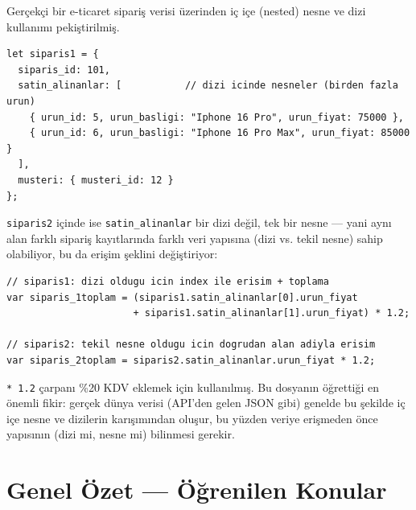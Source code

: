 \documentclass[11pt,a4paper]{article}
\begin{document}
Gerçekçi bir e-ticaret sipariş verisi üzerinden iç içe (nested) nesne ve dizi kullanımı pekiştirilmiş.

\begin{lstlisting}
let siparis1 = {
  siparis_id: 101,
  satin_alinanlar: [           // dizi icinde nesneler (birden fazla urun)
    { urun_id: 5, urun_basligi: "Iphone 16 Pro", urun_fiyat: 75000 },
    { urun_id: 6, urun_basligi: "Iphone 16 Pro Max", urun_fiyat: 85000 }
  ],
  musteri: { musteri_id: 12 }
};
\end{lstlisting}

\texttt{siparis2} içinde ise \texttt{satin\_alinanlar} bir dizi değil, tek bir nesne --- yani aynı alan farklı sipariş kayıtlarında farklı veri yapısına (dizi vs. tekil nesne) sahip olabiliyor, bu da erişim şeklini değiştiriyor:

\begin{lstlisting}
// siparis1: dizi oldugu icin index ile erisim + toplama
var siparis_1toplam = (siparis1.satin_alinanlar[0].urun_fiyat
                      + siparis1.satin_alinanlar[1].urun_fiyat) * 1.2;

// siparis2: tekil nesne oldugu icin dogrudan alan adiyla erisim
var siparis_2toplam = siparis2.satin_alinanlar.urun_fiyat * 1.2;
\end{lstlisting}

\texttt{* 1.2} çarpanı \%20 KDV eklemek için kullanılmış. Bu dosyanın öğrettiği en önemli fikir: gerçek dünya verisi (API'den gelen JSON gibi) genelde bu şekilde iç içe nesne ve dizilerin karışımından oluşur, bu yüzden veriye erişmeden önce yapısının (dizi mi, nesne mi) bilinmesi gerekir.

\newpage

\section{Genel Özet --- Öğrenilen Konular}
\end{document}
